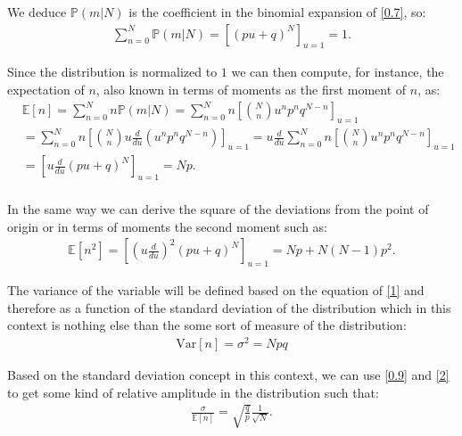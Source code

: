 \documentclass[12pt]{article}
\numberwithin{equation}{section}
\begin{document}
We deduce $\mathbb{P}(m | N)$ is the coefficient in the binomial expansion of \ref{0.7}, so:
\begin{equation} \label{0.8}
    \begin{split}
          \sum^N_{n=0} \mathbb{P}(m | N)  = [(pu + q)^N]_{u=1} = 1.
    \end{split}
\end{equation}

Since the distribution is normalized to $1$ we can then compute, for instance, the expectation of $n$, also known in terms of moments as the first moment of $n$, as: 
\begin{equation} \label{0.9}
    \begin{split}
          & \mathbb{E}[n] = \sum^N_{n=0} n  \mathbb{P}(m | N) = \sum^N_{n=0} n\left[\binom{N}{n}u^n p^n q^{N-n}\right]_{u=1} \\
          & = \sum^N_{n=0} n\left[\binom{N}{n}u\frac{d}{du}(u^n p^n q^{N-n})\right]_{u=1} = u\frac{d}{du}\sum^N_{n=0} n\left[\binom{N}{n}u^n p^n q^{N-n}\right]_{u=1} \\
          & = \left[u\frac{d}{du}(pu + q)^N\right]_{u=1} = Np. \\
    \end{split}
\end{equation}

In the same way we can derive the square of the deviations from the point of origin or in terms of moments the second moment such as: 
\begin{equation} \label{1}
    \begin{split}
          \mathbb{E}[n^2] = \left[\left(u\frac{d}{du}\right)^2(pu + q)^N\right]_{u=1} = Np + N(N-1)p^2.
    \end{split}
\end{equation}

The variance of the variable will be defined based on the equation of \ref{1} and therefore as a function of the standard deviation of the distribution which in this context is nothing else than the some sort of measure of the distribution: 
\begin{equation} \label{2}
    \begin{split}
          \text{Var}[n] = \sigma^2 = Npq
    \end{split}
\end{equation}

Based on the standard deviation concept in this context, we can use \ref{0.9} and \ref{2} to get some kind of relative amplitude in the distribution such that: 
\begin{equation} \label{3}
    \begin{split}
          \frac{\sigma}{\mathbb{E}[n]} = \sqrt{\frac{q}{p}}\frac{1}{\sqrt{N}}.
    \end{split}
\end{equation}
\end{document}
